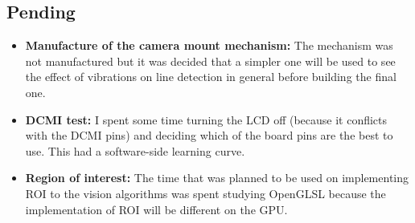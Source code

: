 \subsection{Pending}

\begin{itemize}
	\item \textbf{Manufacture of the camera mount mechanism:} The mechanism was not manufactured but it was decided that a simpler one will be used to see the effect of vibrations on line detection in general before building the final one.
	\item \textbf{DCMI test:} I spent some time turning the LCD off (because it conflicts with the DCMI pins) and deciding which of the board pins are the best to use. This had a software-side learning curve.
	\item \textbf{Region of interest:} The time that was planned to be used on implementing ROI to the vision algorithms was spent studying OpenGLSL because the implementation of ROI will be different on the GPU.
\end{itemize}

